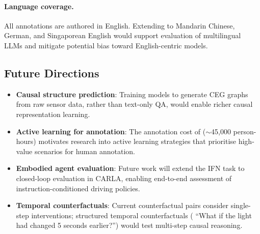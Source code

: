 \paragraph{Language coverage.} All annotations are authored in English. Extending
\lucid{} to Mandarin Chinese, German, and Singaporean English would support
evaluation of multilingual LLMs and mitigate potential bias toward English-centric
models.

\subsection{Future Directions}
\label{ssec:limitations_future}

\begin{itemize}[leftmargin=2em, noitemsep]
  \item \textbf{Causal structure prediction}: Training models to generate CEG graphs
        from raw sensor data, rather than text-only QA, would enable richer causal
        representation learning.
  \item \textbf{Active learning for annotation}: The annotation cost of \lucid{}
        ($\sim$45,000 person-hours) motivates research into active learning strategies
        that prioritise high-value scenarios for human annotation.
  \item \textbf{Embodied agent evaluation}: Future work will extend the IFN task to
        closed-loop evaluation in CARLA, enabling end-to-end assessment of instruction-conditioned
        driving policies.
  \item \textbf{Temporal counterfactuals}: Current counterfactual pairs consider
        single-step interventions; structured temporal counterfactuals (\eg{} ``What if
        the light had changed 5 seconds earlier?'') would test multi-step causal reasoning.
\end{itemize}

